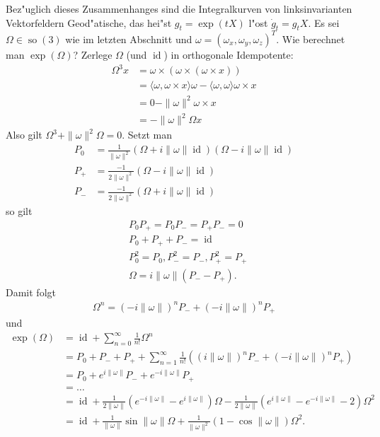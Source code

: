 \documentclass[paper=A4, twoside, chapterprefix=true, bibliography=totoc, headsepline]{scrbook}
\DeclareMathOperator{\id}{id} %
\DeclareMathOperator{\so}{so}
\newcommand{\X}{\times}
\theoremstyle{nonumberbreak}
\theoremstyle{emptybreak}
\theoremstyle{break}
\begin{document}
Bez"uglich dieses Zusammenhanges sind die Integralkurven von linksinvarianten Vektorfeldern Geod"atische, das hei"st $g_t = \exp(t X)$ l"ost $\dot{g}_t = g_t X$.
Es sei $\Omega \in \so(3)$ wie im letzten Abschnitt und $\omega = (\omega_x, \omega_y, \omega_z)^T$.
Wie berechnet man $\exp(\Omega)$?
Zerlege $\Omega$ (und $\id$) in orthogonale Idempotente:
\begin{align*}
	\Omega^3 x &= \omega \X (\omega \X (\omega \X x)) \\
	&= \langle \omega, \omega \X x \rangle \omega - \langle \omega, \omega \rangle \omega \X x \\
	&= 0 - \|\omega\|^2 \omega \X x \\
	&= -\|\omega\|^2 \Omega x
\end{align*}
Also gilt $\Omega^3 + \|\omega\|^2 \Omega = 0$.
Setzt man
\begin{align*}
	P_0 &= \frac{1}{\|\omega\|^2} \left( \Omega + i \|\omega\| \id \right) \left(\Omega - i \|\omega\| \id \right) \\
	P_+ &= \frac{-1}{2 \|\omega\|^2} \left( \Omega - i \|\omega\| \id \right) \\
	P_- &= \frac{-1}{2 \|\omega\|^2} \left( \Omega + i \|\omega\| \id \right)
\end{align*}
so gilt
\begin{align*}
	&P_0 P_+ = P_0 P_- = P_+ P_- = 0 \\
	&P_0 + P_+ + P_- = \id \\
	&P_0^2 = P_0, P_-^2 = P_-, P_+^2 = P_+ \\
	&\Omega = i \|\omega\| (P_- - P_+).
\end{align*}
Damit folgt
\begin{align*}
	\Omega^n = (-i \|\omega\|)^n P_- + (-i \|\omega\|)^n P_+
\end{align*}
und
\begin{align*}
	\exp(\Omega) &= \id + \sum_{n=0}^{\infty} \frac{1}{n!} \Omega^n \\
	&= P_0 + P_- + P_+ + \sum_{n=1}^{\infty} \frac{1}{n!} \left( (i \| \omega \|)^n P_- + (-i \| \omega \|)^n P_+ \right) \\
	&= P_0 + e^{i \|\omega\|} P_- + e^{-i \|\omega\|} P_+ \\
	&= \ldots \\
	&= \id + \frac{1}{2 \|\omega\|} \left( e^{-i \|\omega\|} - e^{i \|\omega\|} \right) \Omega - \frac{1}{2 \|\omega\|} \left( e^{i \|\omega\|} - e^{-i \|\omega\|} - 2 \right) \Omega^2 \\
	&= \id + \frac{1}{\|\omega\|} \sin \|\omega\| \Omega + \frac{1}{\|\omega\|^2} ( 1 - \cos \|\omega\|) \Omega^2.
\end{align*}
\end{document}
